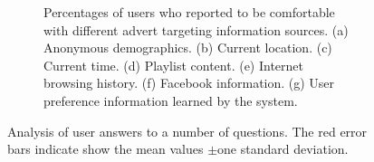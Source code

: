 \begin{figure}[h!]
\begin{subfigure}[t]{0.49\textwidth}
			\caption{Percentages of users who reported to be comfortable with different advert targeting information sources. (a) Anonymous demographics. (b) Current location. (c) Current time. (d) Playlist content. (e) Internet browsing history. (f) Facebook information. (g) User preference information learned by the system.}
		\end{subfigure}
		\caption{Analysis of user answers to a number of questions. The red error bars indicate show the mean values $\pm$one standard deviation.}
		\label{fig:qualitative_results}
	\end{figure}
